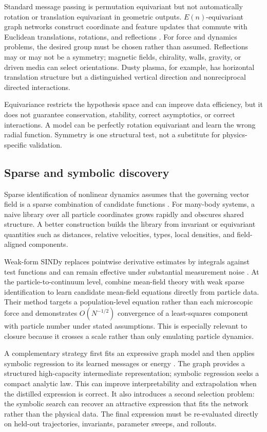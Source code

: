 Standard message passing is permutation equivariant but not automatically rotation or translation equivariant in geometric outputs. \(E(n)\)-equivariant graph networks construct coordinate and feature updates that commute with Euclidean translations, rotations, and reflections \citep{satorras2021egnn}. For force and dynamics problems, the desired group must be chosen rather than assumed. Reflections may or may not be a symmetry; magnetic fields, chirality, walls, gravity, or driven media can select orientations. Dusty plasma, for example, has horizontal translation structure but a distinguished vertical direction and nonreciprocal directed interactions.

Equivariance restricts the hypothesis space and can improve data efficiency, but it does not guarantee conservation, stability, correct asymptotics, or correct interactions. A model can be perfectly rotation equivariant and learn the wrong radial function. Symmetry is one structural test, not a substitute for physics-specific validation.

\subsection{Sparse and symbolic discovery}

Sparse identification of nonlinear dynamics assumes that the governing vector field is a sparse combination of candidate functions \citep{brunton2016sindy}. For many-body systems, a naive library over all particle coordinates grows rapidly and obscures shared structure. A better construction builds the library from invariant or equivariant quantities such as distances, relative velocities, types, local densities, and field-aligned components.

Weak-form SINDy replaces pointwise derivative estimates by integrals against test functions and can remain effective under substantial measurement noise \citep{messenger2021wsindy}. At the particle-to-continuum level, \citet{messenger2022meanfield} combine mean-field theory with weak sparse identification to learn candidate mean-field equations directly from particle data. Their method targets a population-level equation rather than each microscopic force and demonstrates \(O(N^{-1/2})\) convergence of a least-squares component with particle number under stated assumptions. This is especially relevant to closure because it crosses a scale rather than only emulating particle dynamics.

A complementary strategy first fits an expressive graph model and then applies symbolic regression to its learned messages or energy \citep{cranmer2020symbolic}. The graph provides a structured high-capacity intermediate representation; symbolic regression seeks a compact analytic law. This can improve interpretability and extrapolation when the distilled expression is correct. It also introduces a second selection problem: the symbolic search can recover an attractive expression that fits the network rather than the physical data. The final expression must be re-evaluated directly on held-out trajectories, invariants, parameter sweeps, and rollouts.

